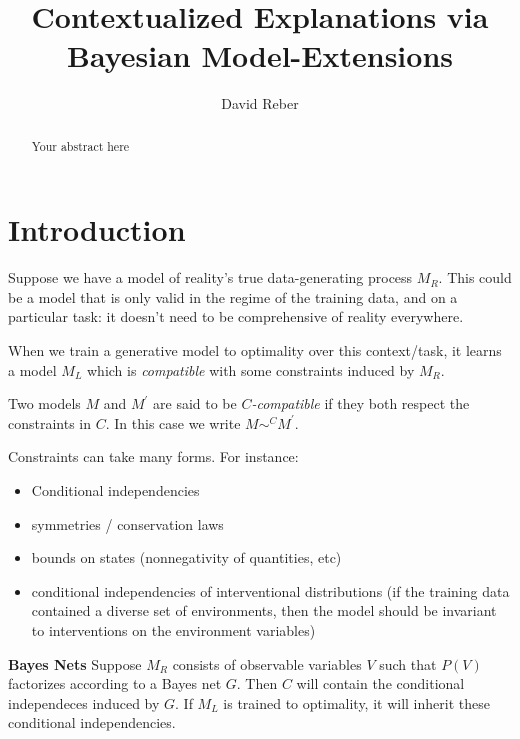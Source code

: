 \documentclass{article}
\title{Contextualized Explanations via Bayesian Model-Extensions}
\date{}
\author[1]{David Reber}
\affil[1]{University of Chicago}
\begin{document}
\maketitle

\begin{abstract}
Your abstract here
\end{abstract}

\section{Introduction}

Suppose we have a model of reality's true data-generating process $M_R$. This could be a model that is only valid in the regime of the training data, and on a particular task: it doesn't need to be comprehensive of reality everywhere. 

When we train a generative model to optimality over this context/task, it learns a model $M_L$ which is \emph{compatible} with some constraints induced by $M_R$.

\begin{definition}
  Two models $M$ and $M^\prime$ are said to be \emph{$C$-compatible} if they both respect the constraints in $C$. In this case we write $M \sim^C M^\prime$.
\end{definition}

\begin{definition}
  Constraints can take many forms. For instance:
  \begin{itemize}
    \item Conditional independencies
    \item symmetries / conservation laws
    \item bounds on states (nonnegativity of quantities, etc)
    \item conditional independencies of interventional distributions (if the training data contained a diverse set of environments, then the model should be invariant to interventions on the environment variables)
  \end{itemize}
\end{definition}

\begin{example}{\textbf{Bayes Nets}}
  Suppose $M_R$ consists of observable variables $V$ such that $P(V)$ factorizes according to a Bayes net $G$. Then $C$ will contain the conditional independeces induced by $G$. If $M_L$ is trained to optimality, it will inherit these conditional independencies.
\end{example}
\end{document}
